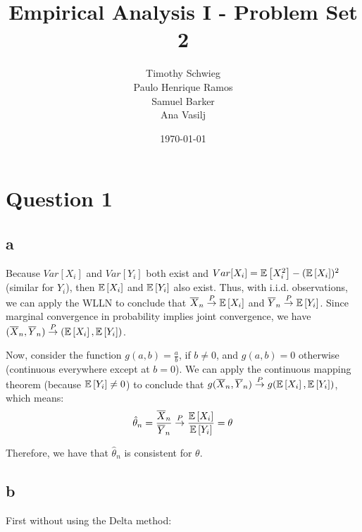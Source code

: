 \documentclass[12pt]{paper}
\begin{document}
\author{
{Timothy Schwieg}\\
{Paulo Henrique Ramos}\\
{Samuel Barker}\\
{Ana Vasilj}
}

\date{\today}
\title{Empirical Analysis I -  Problem Set 2}


\maketitle

\section*{Question 1}

\subsection*{a}

Because $Var[X_i]$ and $Var[Y_i]$ both exist and
$Var[X_i]=\mathbb{E} \left [ X_i^2 \right ]-(\mathbb{E} \left [ X_i \right ])^2$ (similar for $Y_i$), then
$\mathbb{E} \left [ X_i \right ]$ and $\mathbb{E} \left [ Y_i \right ]$ also exist. Thus, with
i.i.d. observations, we can apply the WLLN to conclude that
$\overline{X}_n\overset{P}{\to}\mathbb{E} \left [ X_i \right ]$ and
$\overline{Y}_n\overset{P}{\to}\mathbb{E} \left [ Y_i \right ]$. Since marginal convergence in
probability implies joint convergence, we have
$(\overline{X}_n,\overline{Y}_n)\overset{P}{\to}(\mathbb{E} \left [ X_i \right ],\mathbb{E} \left [ Y_i \right ])$.

Now, consider the function $g(a,b)=\frac{a}{b}$, if $b\ne 0$, and
$g(a,b)=0$ otherwise (continuous everywhere except at $b=0$). We can
apply the continuous mapping theorem (because $\mathbb{E} \left [ Y_i \right ]\ne0$) to
conclude that
$g(\overline{X}_n,\overline{Y}_n)\overset{P}{\to}g(\mathbb{E} \left [ X_i \right ],\mathbb{E} \left [ Y_i \right ])$,
which means:
\begin{equation}
\begin{split}
  \hat{\theta}_n=\frac{\overline{X}_n}{\overline{Y}_n}\overset{P}{\to}\frac{\mathbb{E} \left [ X_i \right ]}{\mathbb{E} \left [ Y_i \right ]}=\theta
\end{split}
\end{equation}

Therefore, we have that $\hat{\theta}_n$ is consistent for $\theta$.

\subsection*{b}

First without using the Delta method:
\end{document}
